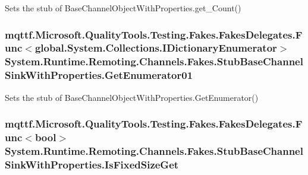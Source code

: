 Sets the stub of Base\-Channel\-Object\-With\-Properties.\-get\-\_\-\-Count()

\hypertarget{class_system_1_1_runtime_1_1_remoting_1_1_channels_1_1_fakes_1_1_stub_base_channel_sink_with_properties_ae1fb39204ba971115ea2834c32d396f8}{
\subsubsection[{Get\-Enumerator01}]{\setlength{\rightskip}{0pt plus 5cm}mqttf.\-Microsoft.\-Quality\-Tools.\-Testing.\-Fakes.\-Fakes\-Delegates.\-Func$<$global.\-System.\-Collections.\-I\-Dictionary\-Enumerator$>$ System.\-Runtime.\-Remoting.\-Channels.\-Fakes.\-Stub\-Base\-Channel\-Sink\-With\-Properties.\-Get\-Enumerator01}}\label{class_system_1_1_runtime_1_1_remoting_1_1_channels_1_1_fakes_1_1_stub_base_channel_sink_with_properties_ae1fb39204ba971115ea2834c32d396f8}


Sets the stub of Base\-Channel\-Object\-With\-Properties.\-Get\-Enumerator()

\hypertarget{class_system_1_1_runtime_1_1_remoting_1_1_channels_1_1_fakes_1_1_stub_base_channel_sink_with_properties_a02f7e8c82d14d1670ba046c31f34bf94}{
\subsubsection[{Is\-Fixed\-Size\-Get}]{\setlength{\rightskip}{0pt plus 5cm}mqttf.\-Microsoft.\-Quality\-Tools.\-Testing.\-Fakes.\-Fakes\-Delegates.\-Func$<$bool$>$ System.\-Runtime.\-Remoting.\-Channels.\-Fakes.\-Stub\-Base\-Channel\-Sink\-With\-Properties.\-Is\-Fixed\-Size\-Get}}\label{class_system_1_1_runtime_1_1_remoting_1_1_channels_1_1_fakes_1_1_stub_base_channel_sink_with_properties_a02f7e8c82d14d1670ba046c31f34bf94}


